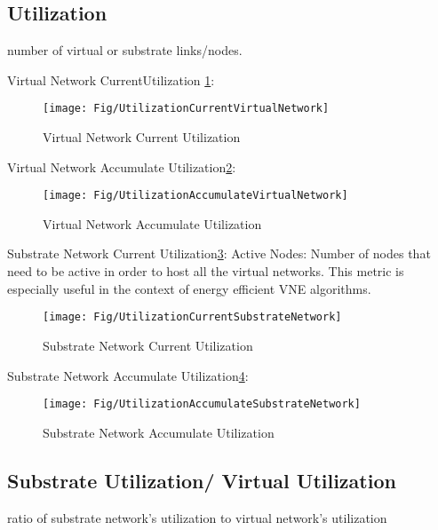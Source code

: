 \subsection{Utilization}
number of virtual or substrate links/nodes.

Virtual Network CurrentUtilization \ref{fig:UtilizationCurrentVirtualNetwork}:
\begin{figure}
  \centering
  \texttt{[image: Fig/UtilizationCurrentVirtualNetwork]}\\
  \caption{Virtual Network Current Utilization}\label{fig:UtilizationCurrentVirtualNetwork}
\end{figure}

Virtual Network Accumulate Utilization\ref{fig:UtilizationAccumulateVirtualNetwork}:
\begin{figure}
  \centering
  \texttt{[image: Fig/UtilizationAccumulateVirtualNetwork]}\\
  \caption{Virtual Network Accumulate Utilization}\label{fig:UtilizationAccumulateVirtualNetwork}
\end{figure}

Substrate Network Current Utilization\ref{fig:UtilizationCurrentSubstrateNetwork}: Active Nodes: Number of nodes that need to be active in order to host all the virtual networks. This metric is especially useful in the context of energy efficient VNE algorithms.
\begin{figure}
  \centering
  \texttt{[image: Fig/UtilizationCurrentSubstrateNetwork]}\\
  \caption{Substrate Network Current Utilization}\label{fig:UtilizationCurrentSubstrateNetwork}
\end{figure}

Substrate Network Accumulate Utilization\ref{fig:UtilizationAccumulateSubstrateNetwork}:
\begin{figure}
  \centering
  \texttt{[image: Fig/UtilizationAccumulateSubstrateNetwork]}\\
  \caption{Substrate Network Accumulate Utilization}\label{fig:UtilizationAccumulateSubstrateNetwork}
\end{figure}


\subsection{Substrate Utilization/ Virtual Utilization}
ratio of substrate network's utilization to virtual network's utilization

